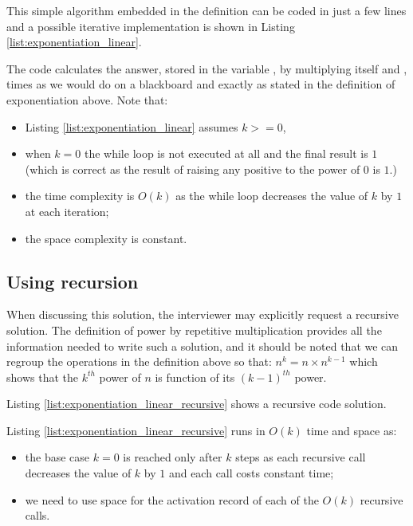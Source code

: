 This simple algorithm embedded in the definition can be coded in just a few lines and a possible iterative implementation is shown in Listing
\ref{list:exponentiation_linear}.




The code calculates the answer, stored in the variable , by multiplying  itself and ,  times as we would do on a blackboard and exactly as stated in the definition of exponentiation above.
Note that:
\begin{itemize}
    \item Listing \ref{list:exponentiation_linear} assumes $k >=0$,
    \item when $k=0$ the while loop is not executed at all and the final result is $1$ (which is correct as the result of raising any positive to the power of $0$ is $1$.)
    \item the time complexity is $O(k)$ as the while loop decreases the value of $k$ by $1$ at each iteration;
    \item the space complexity is constant. 
\end{itemize}

\subsection{Using recursion}
When discussing this solution, the interviewer may explicitly request a recursive solution. The definition of power by repetitive multiplication provides all the information needed to write such a solution, and it should be noted that we can regroup the operations in the definition above so that: $n^k = n \times n^{k-1}$ which shows that the ${k^{th}}$ power of $n$ is function of its ${(k-1)^{th}}$ power. 

Listing \ref{list:exponentiation_linear_recursive}  shows a recursive code solution.



Listing \ref{list:exponentiation_linear_recursive} runs in $O(k)$ time and space as:
\begin{itemize}
    \item the base case $k=0$ is reached only after $k$ steps as each recursive call decreases the value of $k$ by $1$ and each call costs constant time; 
    \item we need to use space for the activation record of each of the $O(k)$ recursive calls.
\end{itemize}



